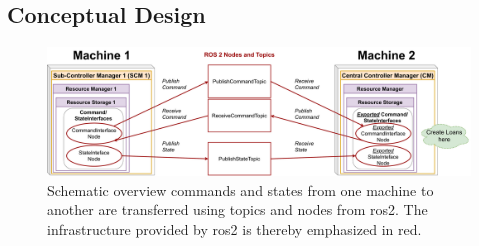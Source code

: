\chapter{}
\label{sec:concept}

\section{Conceptual Design}
\begin{figure}[htbp]
	\centering
    \includegraphics[width=1\textwidth]{Figures/C4/simple_concept.drawio.pdf}
	\caption{Schematic overview commands and states from one machine to another are transferred using topics and nodes from \gls{ros2}. The infrastructure provided by \gls{ros2} is thereby emphasized in red.}
	\label{c4_fig_simple_concept}
\end{figure}

